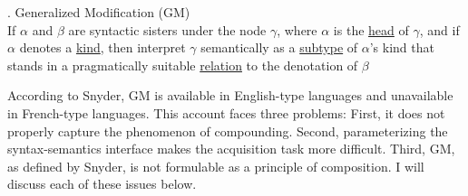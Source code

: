 \documentclass[MilwayThesis]{subfiles}
\begin{document}
\ex. Generalized Modification (GM)\\
If $\alpha$ and $\beta$ are syntactic sisters under the node $\gamma$, where $\alpha$ is the \uline{head} of $\gamma$, and if $\alpha$ denotes a \uline{kind}, then interpret $\gamma$ semantically as a \uline{subtype} of $\alpha$'s kind that stands in a pragmatically suitable \uline{relation} to the denotation of $\beta$

According to Snyder, GM is available in English-type languages and unavailable in French-type languages.
This account faces three problems:
First, it does not properly capture the phenomenon of compounding.
Second, parameterizing the syntax-semantics interface makes the acquisition task more difficult.
Third, GM, as defined by Snyder, is not formulable as a principle of composition.
I will discuss each of these issues below.
\end{document}
